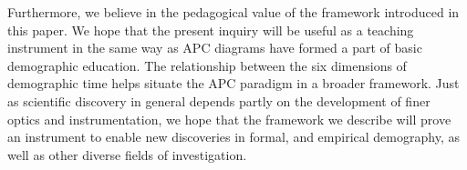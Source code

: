\documentclass[12pt,oneside,a4paper]{article} %
\newcommand\vt[1]{\textcolor{rd}{#1}}
\begin{document}
Furthermore, we believe in the pedagogical value of the framework
introduced in this paper. We hope that the
present inquiry will be useful as a teaching instrument in the same way as APC
diagrams have formed a part of basic demographic education.
The relationship between the six dimensions of demographic time helps situate the APC
paradigm in a broader framework. Just as scientific discovery in general
depends partly on the development of finer optics and instrumentation, we hope
that the framework we describe will prove an instrument to enable new
discoveries in formal, and empirical demography, as well as other diverse fields of
investigation.



\end{document}
